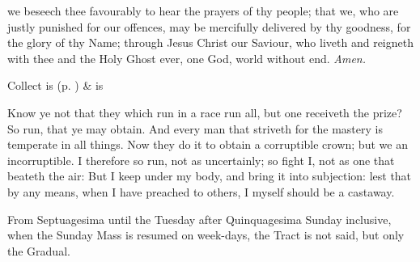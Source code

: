 \collect
{} we beseech thee favourably to hear the prayers of thy people; that we, who are justly punished for our offences, may be mercifully delivered by thy goodness, for the glory of thy Name; through Jesus Christ our Saviour, who liveth and reigneth with thee and the Holy Ghost ever, one God, world without end. \textit{Amen.}
\begin{rubric}
     Collect is  (p. \pageref{SPSaints}) \&  is 
\end{rubric}

 Know ye not that they which run in a race run all, but one receiveth the prize? So run, that ye may obtain. And every man that striveth for the mastery is temperate in all things. Now they do it to obtain a corruptible crown; but we an incorruptible. I therefore so run, not as uncertainly; so fight I, not as one that beateth the air: But I keep under my body, and bring it into subjection: lest that by any means, when I have preached to others, I myself should be a castaway.


\begin{rubric}
    From Septuagesima until the Tuesday after Quinquagesima Sunday inclusive, when the Sunday Mass is resumed on week-days, the Tract is not said, but only the Gradual.
\end{rubric}


